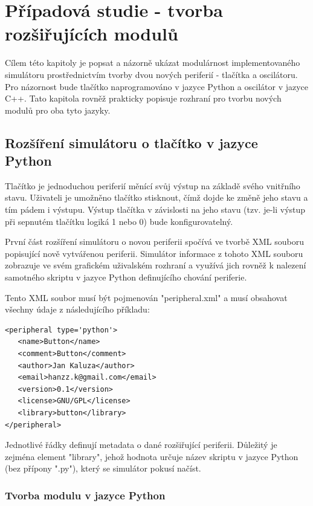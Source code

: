 \chapter{Případová studie - tvorba rozšiřujících modulů}

Cílem této kapitoly je popsat a názorně ukázat modulárnost implementovaného simulátoru prostřednictvím tvorby dvou nových periferií - tlačítka a oscilátoru. Pro názornost bude tlačítko naprogramováno v jazyce Python a oscilátor v jazyce C++. Tato kapitola rovněž prakticky popisuje rozhraní pro tvorbu nových modulů pro oba tyto jazyky.

\section{Rozšíření simulátoru o tlačítko v jazyce Python}
\label{tlacitko}

Tlačítko je jednoduchou periferií měnící svůj výstup na základě svého vnitřního stavu. Uživateli je umožněno tlačítko stisknout, čímž dojde ke změně jeho stavu a tím pádem i výstupu. Výstup tlačítka v závislosti na jeho stavu (tzv. je-li výstup při sepnutém tlačítku logiká 1 nebo 0) bude konfigurovatelný.

První část rozšíření simulátoru o novou periferii spočívá ve tvorbě XML souboru popisující nově vytvářenou periferii. Simulátor informace z tohoto XML souboru zobrazuje ve svém grafickém uživalském rozhraní a využívá jich rovněž k nalezení samotného skriptu v jazyce Python definujícího chování periferie.

Tento XML soubor musí být pojmenován "peripheral.xml" a musí obsahovat všechny údaje z následujícího příkladu:

\lstset{language=XML, numbers=left, frame=single, breaklines=true, tabsize=2, xleftmargin=20pt}
\begin{lstlisting}
<peripheral type='python'>
   <name>Button</name>
   <comment>Button</comment>
   <author>Jan Kaluza</author>
   <email>hanzz.k@gmail.com</email>
   <version>0.1</version>
   <license>GNU/GPL</license>
   <library>button</library>
</peripheral>
\end{lstlisting}

Jednotlivé řádky definují metadata o dané rozšiřující periferii. Důležitý je zejména element "library", jehož hodnota určuje název skriptu v jazyce Python (bez přípony ".py"), který se simulátor pokusí načíst.

\subsection{Tvorba modulu v jazyce Python}

